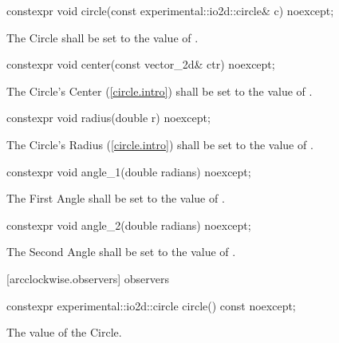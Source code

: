 \begin{itemdecl}
constexpr void circle(const experimental::io2d::circle& c) noexcept;
\end{itemdecl}
\begin{itemdescr}
\pnum
\effects
The Circle shall be set to the value of .
\end{itemdescr}

\begin{itemdecl}
constexpr void center(const vector_2d& ctr) noexcept;
\end{itemdecl}
\begin{itemdescr}
\pnum
\effects
The Circle's Center (\ref{circle.intro}) shall be set to the value of .
\end{itemdescr}

\begin{itemdecl}
constexpr void radius(double r) noexcept;
\end{itemdecl}
\begin{itemdescr}
\pnum
\effects
The Circle's Radius (\ref{circle.intro}) shall be set to the value of .
\end{itemdescr}

\begin{itemdecl}
constexpr void angle_1(double radians) noexcept;
\end{itemdecl}
\begin{itemdescr}
\pnum
\effects
The First Angle shall be set to the value of .
\end{itemdescr}

\begin{itemdecl}
constexpr void angle_2(double radians) noexcept;
\end{itemdecl}
\begin{itemdescr}
\pnum
\effects
The Second Angle shall be set to the value of .
\end{itemdescr}

 [arcclockwise.observers]{ observers}

\begin{itemdecl}
constexpr experimental::io2d::circle circle() const noexcept;
\end{itemdecl}
\begin{itemdescr}
\pnum
\returns
The value of the Circle.
\end{itemdescr}

